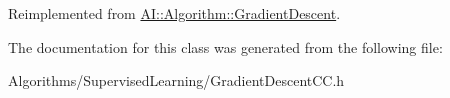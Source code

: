 Reimplemented from \hyperlink{classAI_1_1Algorithm_1_1GradientDescent_a5c5ae472417bc016fdd185875614359d}{A\+I\+::\+Algorithm\+::\+Gradient\+Descent}.



The documentation for this class was generated from the following file\+:\begin{DoxyCompactItemize}
\item 
Algorithms/\+Supervised\+Learning/Gradient\+Descent\+C\+C.\+h\end{DoxyCompactItemize}
